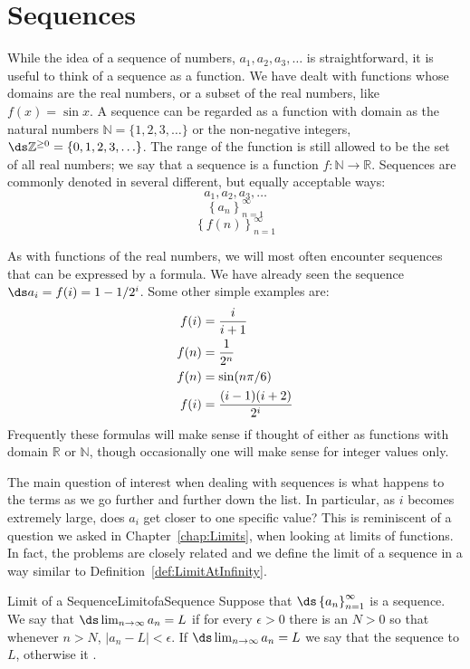 \section{Sequences}\label{sec:sequences}
While the idea of a sequence of numbers, $a_1,a_2,a_3,\ldots$ is
straightforward, it is useful to think of a sequence as a function. We
have dealt with functions whose domains are the real
numbers, or a subset of the real numbers, like $f(x)=\sin x$. A
sequence can be regarded as a function with domain as the natural numbers
$\mathbb{N}=\{1,2,3,\ldots\}$ or the non-negative integers,
$\ds \mathbb{Z}^{\geq 0}=\{0,1,2,3,\ldots\}$. The range of the function is still
allowed to be the set of all real numbers; we say that a sequence is
a function $f\colon \mathbb{N}\to\mathbb{R}$. Sequences are commonly denoted in several different, but equally acceptable ways:
$$a_1,a_2,a_3,\ldots $$
$$\left\{a_n\right\}_{n=1}^\infty $$
$$\left\{f(n)\right\}_{n=1}^\infty $$

As with functions of the real numbers,
we will most often encounter sequences that can be expressed by a
formula. We have already seen the sequence $\ds a_i=f(i)=1-1/2^i$.
Some other simple examples are:
\begin{align*}
f(i)&={i\over i+1}	\\
f(n)&={1\over2^n}	\\
f(n)&=\sin(n\pi/6)	\\
f(i)&={(i-1)(i+2)\over2^i}	\\
\end{align*}
Frequently these formulas will make sense if thought of either as
functions with domain $\mathbb{R}$ or $\mathbb{N}$, though occasionally one will make
sense for integer values only. 

The main question of interest when dealing with sequences is what happens to the terms as we go further and further down the list. In particular, as $i$ becomes extremely large, does $a_i$ get closer to one specific value? This is reminiscent of a question we asked in Chapter~\ref{chap:Limits}, when looking at limits of functions. In fact, the problems are closely related and we define the limit of a sequence in a way similar to Definition~\ref{def:LimitAtInfinity}.

\begin{definition}{Limit of a Sequence}{LimitofaSequence}
Suppose that $\ds\left\{a_n\right\}_{n=1}^\infty$ is a sequence.
We say that $\ds \lim_{n\to \infty}a_n=L$ if for every $\epsilon>0$
there is an $N > 0$ so that whenever $n>N$, $|a_n-L|<\epsilon$. If
$\ds \lim_{n\to\infty}a_n=L$ we say that the sequence  to $L$, otherwise it .  
\end{definition}

